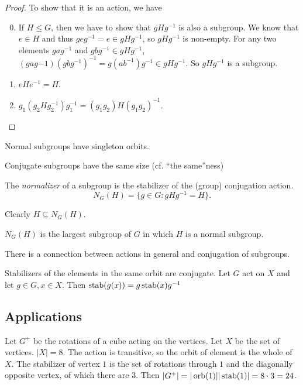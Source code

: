 \documentclass[a4paper]{article}
\begin{document}
  \begin{proof}
    To show that it is an action, we have
    \begin{enumerate}[label=\arabic{*}.]
        \setcounter{enumi}{-1}
      \item If $H\leq G$, then we have to show that $gHg^{-1}$ is also a subgroup. We know that $e\in H$ and thus $geg^{-1} = e\in gHg^{-1}$, so $gHg^{-1}$ is non-empty. For any two elements $gag^{-1}$ and $gbg^{-1}\in gHg^{-1}$, $(gag{-1})(gbg^{-1})^{-1} = g(ab^{-1})g^{-1}\in gHg^{-1}$. So $gHg^{-1}$ is a subgroup.
      \item $eHe^{-1} = H$.
      \item $g_1(g_2Hg_2^{-1})g_1^{-1} = (g_1g_2)H(g_1g_2)^{-1}$.
    \end{enumerate}
  \end{proof}
  \note Normal subgroups have singleton orbits.

  \note Conjugate subgroups have the same size (cf. ``the same''ness)

  \begin{defi}
    The \emph{normalizer} of a subgroup is the stabilizer of the (group) conjugation action.
    \[
      N_G(H) = \{g\in G: gHg^{-1} = H\}.
    \]
  \end{defi}
  \note Clearly $H\subseteq N_G(H)$.

  \begin{prop}
    $N_G(H)$ is the largest subgroup of $G$ in which $H$ is a normal subgroup.
  \end{prop}

  There is a connection between actions in general and conjugation of subgroups.

  \begin{lemma}
    Stabilizers of the elements in the same orbit are conjugate. Let $G$ act on $X$ and let $g\in G, x\in X$. Then $\operatorname{stab}(g(x)) = g\operatorname{stab}(x)g^{-1}$
  \end{lemma}

  \subsection{Applications}
  \begin{eg}
    Let $G^{+}$ be the rotations of a cube acting on the vertices. Let $X$ be the set of vertices. $|X| = 8$. The action is transitive, so the orbit of element is the whole of $X$. The stabilizer of vertex $1$ is the set of rotations through $1$ and the diagonally opposite vertex, of which there are 3. Then $|G^{+}| = |\operatorname{orb}(1)||\operatorname{stab}(1)| = 8\cdot 3 = 24$.
  \end{eg}
\end{document}
